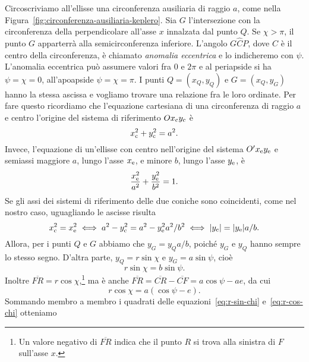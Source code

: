 Circoscriviamo all'ellisse una circonferenza ausiliaria di raggio $a$, come
nella Figura~\ref{fig:circonferenza-ausiliaria-keplero}. Sia $G$ l'intersezione
con la circonferenza della perpendicolare all'asse $x$ innalzata dal punto
$Q$. Se $\chi > \pi$, il punto $G$ apparterrà alla semicirconferenza
inferiore. L'angolo $G\widehat{C}P$, dove $C$ è il centro della circonferenza, è
chiamato \emph{anomalia eccentrica} e lo indicheremo con $\psi$. L'anomalia
eccentrica può assumere valori fra $0$ e $2\pi$ e al periapside si ha
$\psi = \chi = 0$, all'apoapside $\psi = \chi = \pi$. I punti $Q=(x_Q,y_Q)$ e
$G=(x_Q,y_G)$ hanno la stessa ascissa e vogliamo trovare una relazione fra le
loro ordinate. Per fare questo ricordiamo che l'equazione cartesiana di una
circonferenza di raggio $a$ e centro l'origine del sistema di riferimento
$Ox_\textup{c}y_\textup{c}$ è
\begin{equation}
  x_\textup{c}^2 + y_\textup{c}^2 = a^2.
\end{equation}
Invece, l'equazione di un'ellisse con centro nell'origine del sistema
$O'x_\textup{e}y_\textup{e}$ e semiassi maggiore $a$, lungo l'asse
$x_\textup{e}$, e minore $b$, lungo l'asse $y_\textup{e}$, è
\begin{equation}
    \frac{x_\textup{e}^2}{a^2} + \frac{y_\textup{e}^2}{b^2} = 1.
\end{equation}
Se gli assi dei sistemi di riferimento delle due coniche sono coincidenti, come
nel nostro caso, uguagliando le ascisse risulta
\begin{equation}
  x_\textup{c}^2 = x_\textup{e}^2 \iff a^2 - y_\textup{c}^2 = a^2 -
  y_\textup{e}^2a^2/b^2 \iff \lvert y_\textup{c}\rvert = \lvert y_\textup{e}\rvert a/b.
\end{equation}
Allora, per i punti $Q$ e $G$ abbiamo che $y_G = y_Qa/b$, poiché $y_G$ e $y_Q$
hanno sempre lo stesso segno. D'altra parte, $y_Q = r\sin\chi$ e
$y_G = a\sin\psi$, cioè
\begin{equation}
  \label{eq:r-sin-chi}
  r\sin\chi = b\sin\psi.
\end{equation}
Inoltre $\overline{FR} =
r\cos\chi$,\footnote{Un
  valore negativo di $\overline{FR}$ indica che il punto $R$ si trova alla
  sinistra di $F$ sull'asse $x$.} ma è anche $\overline{FR} = \overline{CR} -
\overline{CF} = a\cos\psi - ae$, da cui
\begin{equation}
  \label{eq:r-cos-chi}
  r\cos\chi = a(\cos\psi - e).
\end{equation}
Sommando membro a membro i quadrati delle equazioni~\eqref{eq:r-sin-chi}
e~\eqref{eq:r-cos-chi} otteniamo
